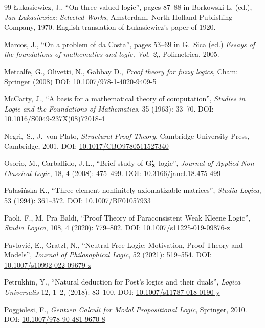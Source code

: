 \documentclass[10pt,a4paper]{article}
\theoremstyle{definition}
\newcommand{\3}{\vspace{.3in}}
\newcommand{\2}{\vspace{.2in}}
\newcommand{\1}{\vspace{.1in}}
\newcommand{\5}{\vspace{.05in}}
\newcommand\DOI[2]{DOI: \href{#1#2}{#2}}
\newcommand{\ts}{\,}
\begin{document}
\begin{thebibliography}{99}
\L ukasiewicz, J., ``On three-valued logic'', pages 87--88 in Bor\-kowski L. (ed.), \textit{Jan \L ukasiewicz: Selected Works}, Amsterdam, North-Holland Publishing Company, 1970. English translation of \L ukasiewicz's paper of 1920.

Marcos, J.,  
``On a problem of da Costa'', pages 53--69 in G.~Sica (ed.) \textit{Essays of the foundations of mathematics and logic, Vol. 2,},  Polimetrica, 2005.

 Metcalfe, G., Olivetti, N., Gabbay D., \textit{Proof theory for fuzzy logics}, Cham: Springer (2008) 
\DOI{http://dx.doi.org/}{10.1007/978-1-4020-9409-5}

McCarty, J., ``A basis for a mathematical theory of computation'', \textit{Studies in Logic and the Foundations of Mathematics}, 35 (1963): 33--70.
\DOI{http://dx.doi.org/}{10.1016/S0049-237X(08)72018-4}

Negri,~S., J.~von Plato, \textit{Structural Proof Theory}, Cambridge University Press, Cambridge, 2001.
\DOI{http://dx.doi.org/}{10.1017/CBO9780511527340}


Osorio, M., Carballido, J.\ts L., ``Brief study of $\bf G_3^\prime $ logic'', \textit{Journal of Applied
Non-Classical Logic}, 18, 4 (2008): 475--499.
\DOI{http://dx.doi.org/}{10.3166/jancl.18.475-499}

Pa\l{}asi\'{n}ska K.,  ``Three-element nonfinitely axiomatizable matrices'', \textit{Studia Logica}, 53 (1994): 361--372.
\DOI{http://dx.doi.org/}{10.1007/BF01057933}

Paoli, F., M. Pra Baldi,  ``Proof Theory of Paraconsistent Weak Kleene Logic'', \textit{Studia Logica}, 108, 4 (2020): 779--802.
\DOI{http://dx.doi.org/}{10.1007/s11225-019-09876-z}

Pavlovi\'{c}, E., Gratzl, N., ``Neutral Free Logic: Motivation, Proof Theory and Models'', \textit{Journal of Philosophical Logic}, 52 (2021): 519--554. \DOI{http://dx.doi.org/}{10.1007/s10992-022-09679-z}

Petrukhin, Y., ``Natural deduction for Post's logics and their duals'', \textit{Logica Universalis} 12, 1--2, (2018): 83--100.
\DOI{http://dx.doi.org/}{10.1007/s11787-018-0190-y}

Poggiolesi, F., \textit{Gentzen Calculi for Modal Propositional Logic}, Springer, 2010. 
\DOI{http://dx.doi.org/}{10.1007/978-90-481-9670-8}


\end{thebibliography}
\end{document}
